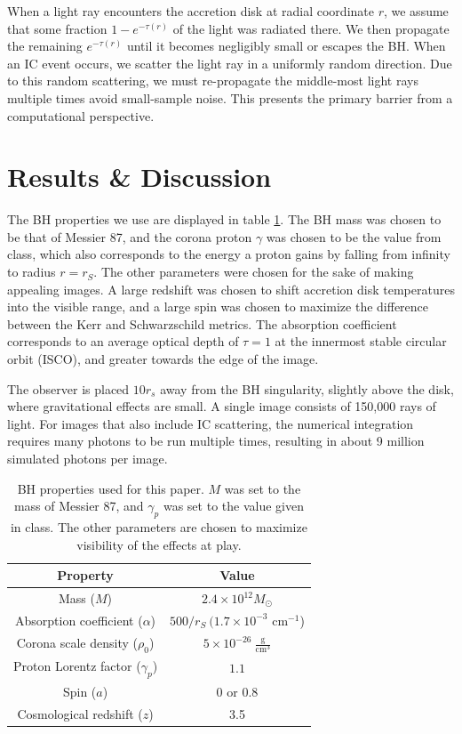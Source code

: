 \documentclass[twocolumn,twocolappendix]{aastex631}
\begin{document}
When a light ray encounters the accretion disk at radial coordinate $r$, we assume that some fraction $1-e^{-\tau(r)}$ of the light was radiated there. We then propagate the remaining $e^{-\tau(r)}$ until it becomes negligibly small or escapes the BH. When an IC event occurs, we scatter the light ray in a uniformly random direction. Due to this random scattering, we must re-propagate the middle-most light rays multiple times avoid small-sample noise. This presents the primary barrier from a computational perspective.


\section{Results \& Discussion}
The BH properties we use are displayed in table \ref{tab:props}. The BH mass was chosen to be that of Messier 87, and the corona proton $\gamma$ was chosen to be the value from class, which also corresponds to the energy a proton gains by falling from infinity to radius $r = r_S$. The other parameters were chosen for the sake of making appealing images. A large redshift was chosen to shift accretion disk temperatures into the visible range, and a large spin was chosen to maximize the difference between the Kerr and Schwarzschild metrics. The absorption coefficient corresponds to an average optical depth of $\tau = 1$ at the innermost stable circular orbit (ISCO), and greater towards the edge of the image.

The observer is placed $10r_s$ away from the BH singularity, slightly above the disk, where gravitational effects are small. A single image consists of 150,000 rays of light. For images that also include IC scattering, the numerical integration requires many photons to be run multiple times, resulting in about 9 million simulated photons per image.

\begin{table}[htbp!]
  \centering
  \begin{tabular}{cc}
    \hline \hline 
    Property  & Value \\ \hline
    Mass ($M$) & $2.4 \times 10^{12} M_\odot$ \\ 
    Absorption coefficient ($\alpha$) & $500/r_S\ (1.7\times 10^{-3}$ cm$^{-1}$) \\ 
    Corona scale density ($\rho_0$) & $5 \times 10^{-26}\ \frac{\text{g}}{\text{cm}^3}$ \\ 
    Proton Lorentz factor ($\gamma_p$) & $1.1$ \\ 
    Spin ($a$) & 0 or 0.8 \\ 
    Cosmological redshift ($z$) & 3.5 \\ 
    \hline \hline
  \end{tabular}
  \caption{BH properties used for this paper. $M$ was set to the mass of Messier 87, and $\gamma_p$ was set to the value given in class. The other parameters are chosen to maximize visibility of the effects at play.}
  \label{tab:props}
\end{table}
\end{document}
